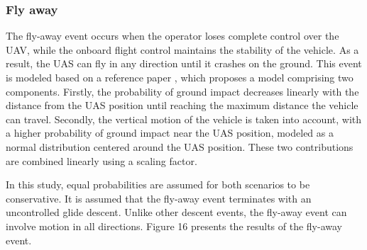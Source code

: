 \documentclass[12pt]{report}
\begin{document}
        \subsubsection{Fly away}
        The fly-away event occurs when the operator loses complete control over the UAV, while the onboard flight
        control maintains the stability of the vehicle. As a result, the UAS can fly in any direction until it crashes
        on the ground. This event is modeled based on a reference paper \cite{la_cour-harbo_quantifying_2019} , which proposes a model comprising two
        components. Firstly, the probability of ground impact decreases linearly with the distance from the UAS position
        until reaching the maximum distance the vehicle can travel. Secondly, the vertical motion of the vehicle is
        taken into account, with a higher probability of ground impact near the UAS position, modeled as a normal
        distribution centered around the UAS position. These two contributions are combined linearly using a scaling
        factor.
            
        In this study, equal probabilities are assumed for both scenarios to be conservative. It is assumed that the
        fly-away event terminates with an uncontrolled glide descent. Unlike other descent events, the fly-away event
        can involve motion in all directions. Figure 16 presents the results of the fly-away event.
\end{document}
